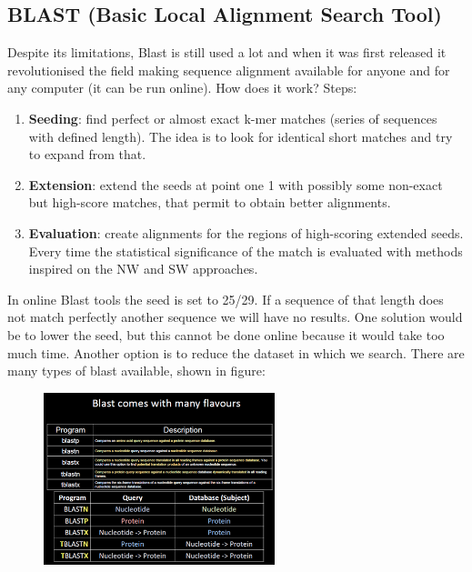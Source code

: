 \subsection{BLAST (Basic Local Alignment Search Tool)}

Despite its limitations, Blast is still used a lot and when it was first released it revolutionised the field making sequence alignment available for anyone and for any computer (it can be run online).
How does it work? Steps:

\begin{enumerate}
    \item \textbf{Seeding}: find perfect or almost exact k-mer matches (series of sequences with defined length). The idea is to look for identical short matches and try to expand from that. 
    \item \textbf{Extension}: extend the seeds at point one 1 with possibly some non-exact but high-score matches, that permit to obtain better alignments.
    \item \textbf{Evaluation}: create alignments for the regions of high-scoring extended seeds. Every time the statistical significance of the match is evaluated with methods inspired on the NW and SW approaches.  
\end{enumerate}

In online Blast tools the seed is set to 25/29. If a sequence of that length does not match perfectly another sequence we will have no results. One solution would be to lower the seed, but this cannot be done online because it would take too much time. Another option is to reduce the dataset in which we search.
There are many types of blast available, shown in figure:

\begin{figure}[h]
\centering
\includegraphics[width=0.6\textwidth]{Blast.png}
\caption{}
\end{figure}

